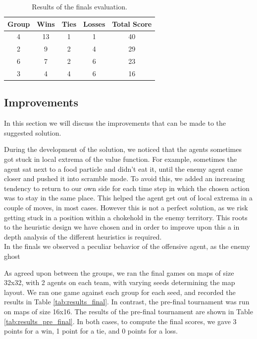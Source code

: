 \documentclass[a4paper,12pt]{article}
\begin{document}
\begin{table}[!hptb]
  \centering
  \begin{tabular}{|c|c|c|c|c|}
    \hline
    \textbf{Group} & \textbf{Wins} & \textbf{Ties} & \textbf{Losses} & \textbf{Total Score} \\
    \hline
    4 & 13 & 1 & 1 & 40 \\
    \hline
    2 & 9 & 2 & 4 & 29 \\
    \hline
    6 & 7 & 2 & 6 & 23 \\
    \hline
    3 & 4 & 4 & 6 & 16 \\
    \hline
  \end{tabular}
  \caption{Results of the finals evaluation.}
  \label{tab:results_finals}
\end{table}




\subsection{Improvements}
\label{subsec:improvements}
In this section we will discuss the improvements that can be made to the suggested solution. 

During the development of the solution, we noticed that the agents sometimes got stuck in local extrema of the value function. 
For example, sometimes the agent sat next to a food particle and didn't eat it, until the enemy agent came closer and pushed it into scramble mode. 
To avoid this, we added an increasing tendency to return to our own side for each time step in which the chosen action was to stay in the same place. 
This helped the agent get out of local extrema in a couple of moves, in most cases. 
However this is not a perfect solution, as we risk getting stuck in a position within a chokehold in the enemy territory. This roots to the heuristic design we have chosen and in order to improve upon this a in depth analysis of the different heuristics is required. \\

In the finals we observed a peculiar behavior of the offensive agent, as the enemy ghost 



As agreed upon between the groups, we ran the final games on maps  of size 32x32, with 2 agents on each team, with varying seeds determining the map layout. We ran one game against each group for each seed, and recorded the results in Table \ref{tab:results_final}. In contrast, the pre-final tournament was run on maps of size 16x16. The results of the pre-final tournament are shown in Table \ref{tab:results_pre_final}. In both cases, to compute the final scores, we gave 3 points for a win, 1 point for a tie, and 0 points for a loss.
\end{document}
